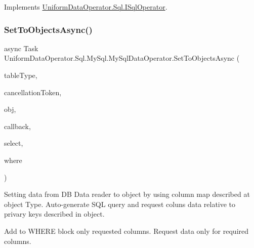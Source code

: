 Implements \mbox{\hyperlink{interface_uniform_data_operator_1_1_sql_1_1_i_sql_operator_a6bde25bff76c7b2105aa4e14740eb07d}{Uniform\+Data\+Operator.\+Sql.\+I\+Sql\+Operator}}.

\mbox{\label{class_uniform_data_operator_1_1_sql_1_1_my_sql_1_1_my_sql_data_operator_a5fc9ae81932a2d5259dd817e91593988}} 
\subsubsection{\texorpdfstring{Set\+To\+Objects\+Async()}{SetToObjectsAsync()}\hspace{0.1cm}{\footnotesize\ttfamily [1/3]}}
{\footnotesize\ttfamily async Task Uniform\+Data\+Operator.\+Sql.\+My\+Sql.\+My\+Sql\+Data\+Operator.\+Set\+To\+Objects\+Async (\begin{DoxyParamCaption}\item[{Type}]{table\+Type,  }\item[{Cancellation\+Token}]{cancellation\+Token,  }\item[{object}]{obj,  }\item[{System.\+Action$<$ I\+List $>$}]{callback,  }\item[{string \mbox{[}$\,$\mbox{]}}]{select,  }\item[{params string \mbox{[}$\,$\mbox{]}}]{where }\end{DoxyParamCaption})}



Setting data from DB Data reader to object by using column map described at object Type. Auto-\/generate S\+QL query and request coluns data relative to privary keys described in object. 

Add to W\+H\+E\+RE block only requested columns. Request data only for required columns. 


